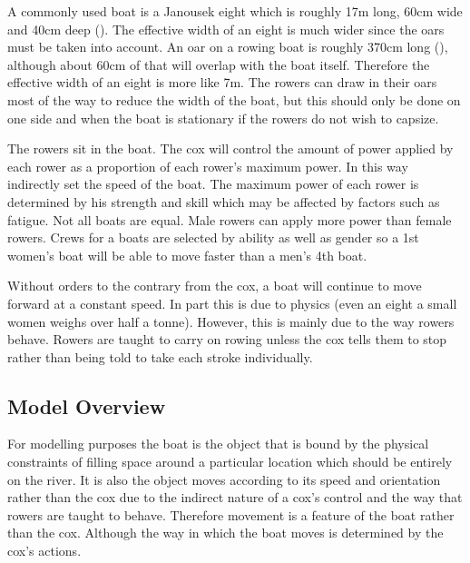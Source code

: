       A commonly used boat is a Janousek eight which is roughly 17m long, 60cm wide and 40cm deep (\cite{Janousek}). The effective width of an eight is much wider since the oars must be taken into account. An oar on a rowing boat is roughly 370cm long (\cite{Concept2}), although about 60cm of that will overlap with the boat itself. Therefore the effective width of an eight is more like 7m. The rowers can draw in their oars most of the way to reduce the width of the boat, but this should only be done on one side and when the boat is stationary if the rowers do not wish to capsize. 
      
      The rowers sit in the boat. The cox will control the amount of power applied by each rower as a proportion of each rower's maximum power. In this way indirectly set the speed of the boat. The maximum power of each rower is determined by his strength and skill which may be affected by factors such as fatigue. Not all boats are equal. Male rowers can apply more power than female rowers. Crews for a boats are selected by ability as well as gender so a 1st women's boat will be able to move faster than a men's 4th boat.
      
      Without orders to the contrary from the cox, a boat will continue to move forward at a constant speed. In part this is due to physics (even an eight a small women weighs over half a tonne). However, this is mainly due to the way rowers behave. Rowers are taught to carry on rowing unless the cox tells them to stop rather than being told to take each stroke individually.
      
      \subsection{Model Overview}\label{model:boat:simplified}
      For modelling purposes the boat is the object that is bound by the physical constraints of filling space around a particular location which should be entirely on the river. It is also the object moves according to its speed and orientation rather than the cox due to the indirect nature of a cox's control and the way that rowers are taught to behave. Therefore movement is a feature of the boat rather than the cox. Although the way in which the boat moves is determined by the cox's actions.
      
